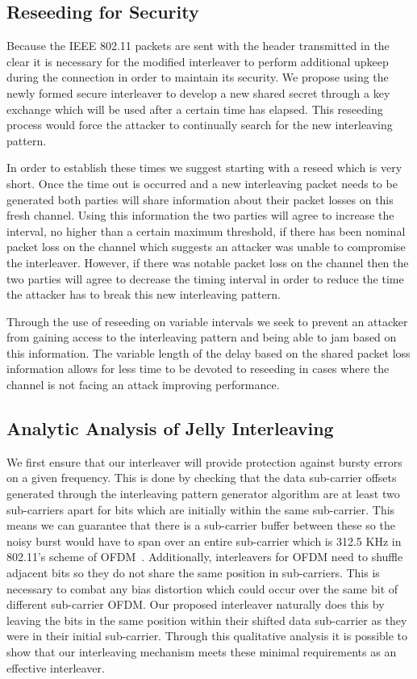 \documentclass[sigconf, anonymous]{acmart}
\begin{document}
\subsection{Reseeding for Security}

Because the IEEE 802.11 packets are sent with the header transmitted in the clear it is necessary for the modified interleaver to perform additional upkeep during the connection in order to maintain its security. We propose using the newly formed secure interleaver to develop a new shared secret through a key exchange which will be used after a certain time has elapsed. This reseeding process would force the attacker to continually search for the new interleaving pattern. 

In order to establish these times we suggest starting with a reseed which is very short. Once the time out is occurred and a new interleaving packet needs to be generated both parties will share information about their packet losses on this fresh channel. Using this information the two parties will agree to increase the interval, no higher than a certain maximum threshold, if there has been nominal packet loss on the channel which suggests an attacker was unable to compromise the interleaver. However, if there was notable packet loss on the channel then the two parties will agree to decrease the timing interval in order to reduce the time the attacker has to break this new interleaving pattern.

Through the use of reseeding on variable intervals we seek to prevent an attacker from gaining access to the interleaving pattern and being able to jam based on this information. The variable length of the delay based on the shared packet loss information allows for less time to be devoted to reseeding in cases where the channel is not facing an attack improving performance.

\subsection{Analytic Analysis of Jelly Interleaving}
\label{sub:analyticAnalysis}

We first ensure that our interleaver will provide protection against bursty errors on a given frequency. This is done by checking that the data sub-carrier offsets generated through the interleaving pattern generator algorithm are at least two sub-carriers apart for bits which are initially within the same sub-carrier. This means we can guarantee that there is a sub-carrier buffer between these so the noisy burst would have to span over an entire sub-carrier which is 312.5 KHz in 802.11's scheme of OFDM~\cite{ieee80211}. Additionally, interleavers for OFDM need to shuffle adjacent bits so they do not share the same position in sub-carriers. This is necessary to combat any bias distortion which could occur over the same bit of different sub-carrier OFDM. Our proposed interleaver naturally does this by leaving the bits in the same position within their shifted data sub-carrier as they were in their initial sub-carrier. Through this qualitative analysis it is possible to show that our interleaving mechanism meets these minimal requirements as an effective interleaver.
\end{document}
